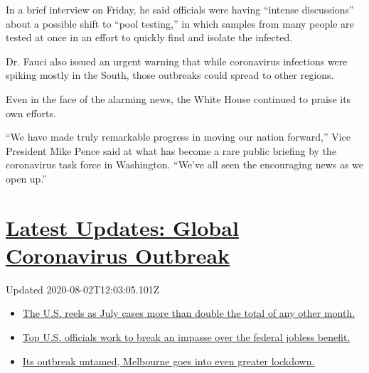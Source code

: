 In a brief interview on Friday, he said officials were having ``intense
discussions'' about a possible shift to ``pool testing,'' in which
samples from many people are tested at once in an effort to quickly find
and isolate the infected.

Dr. Fauci also issued an urgent warning that while coronavirus
infections were spiking mostly in the South, those outbreaks could
spread to other regions.

Even in the face of the alarming news, the White House continued to
praise its own efforts.

``We have made truly remarkable progress in moving our nation forward,''
Vice President Mike Pence said at what has become a rare public briefing
by the coronavirus task force in Washington. ``We've all seen the
encouraging news as we open up.''

\hypertarget{latest-updates-global-coronavirus-outbreak}{%
\section{\texorpdfstring{\href{https://www.nytimes.com/2020/08/01/world/coronavirus-covid-19.html?action=click\&pgtype=Article\&state=default\&region=MAIN_CONTENT_1\&context=storylines_live_updates}{Latest
Updates: Global Coronavirus
Outbreak}}{Latest Updates: Global Coronavirus Outbreak}}\label{latest-updates-global-coronavirus-outbreak}}

Updated 2020-08-02T12:03:05.101Z

\begin{itemize}
\tightlist
\item
  \href{https://www.nytimes.com/2020/08/01/world/coronavirus-covid-19.html?action=click\&pgtype=Article\&state=default\&region=MAIN_CONTENT_1\&context=storylines_live_updates\#link-34047410}{The
  U.S. reels as July cases more than double the total of any other
  month.}
\item
  \href{https://www.nytimes.com/2020/08/01/world/coronavirus-covid-19.html?action=click\&pgtype=Article\&state=default\&region=MAIN_CONTENT_1\&context=storylines_live_updates\#link-780ec966}{Top
  U.S. officials work to break an impasse over the federal jobless
  benefit.}
\item
  \href{https://www.nytimes.com/2020/08/01/world/coronavirus-covid-19.html?action=click\&pgtype=Article\&state=default\&region=MAIN_CONTENT_1\&context=storylines_live_updates\#link-2bc8948}{Its
  outbreak untamed, Melbourne goes into even greater lockdown.}
\end{itemize}


